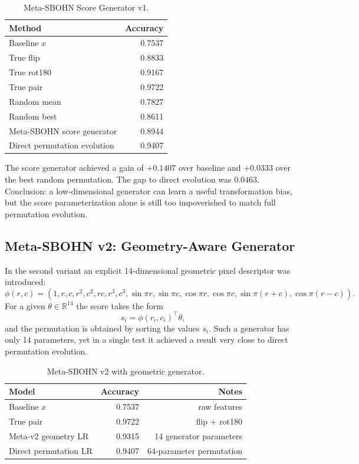 \documentclass[11pt,a4paper]{report}
\begin{document}
\begin{table}[h]
\centering
\caption{Meta-SBOHN Score Generator v1.}
\begin{tabular}{l r}
\hline
Method & Accuracy \\
\hline
Baseline \(x\) & 0.7537 \\
True flip & 0.8833 \\
True rot180 & 0.9167 \\
True pair & 0.9722 \\
Random mean & 0.7827 \\
Random best & 0.8611 \\
Meta-SBOHN score generator & 0.8944 \\
Direct permutation evolution & 0.9407 \\
\hline
\end{tabular}
\end{table}

The score generator achieved a gain of \(+0.1407\) over baseline and \(+0.0333\) over
the best random permutation. The gap to direct evolution was \(0.0463\).
Conclusion: a low-dimensional generator can learn a useful transformation bias,
but the score parameterization alone is still too impoverished to match full permutation
evolution.

\subsection{Meta-SBOHN v2: Geometry-Aware Generator}

In the second variant an explicit 14-dimensional geometric pixel descriptor was introduced:
\[
\phi(r,c)=
(1,r,c,r^2,c^2,rc,r^3,c^3,\sin \pi r,\sin \pi c,
\cos \pi r,\cos \pi c,\sin\pi(r+c),\cos\pi(r-c)).
\]
For a given \(\theta\in\mathbb{R}^{14}\) the score takes the form
\[
  s_i = \phi(r_i,c_i)^\top \theta,
\]
and the permutation is obtained by sorting the values \(s_i\). Such a generator has only
14 parameters, yet in a single test it achieved a result very close to direct
permutation evolution.

\begin{table}[h]
\centering
\caption{Meta-SBOHN v2 with geometric generator.}
\begin{tabular}{l r r}
\hline
Model & Accuracy & Notes \\
\hline
Baseline \(x\) & 0.7537 & raw features \\
True pair & 0.9722 & flip + rot180 \\
Meta-v2 geometry LR & 0.9315 & 14 generator parameters \\
Direct permutation LR & 0.9407 & 64-parameter permutation \\
\hline
\end{tabular}
\end{table}
\end{document}
